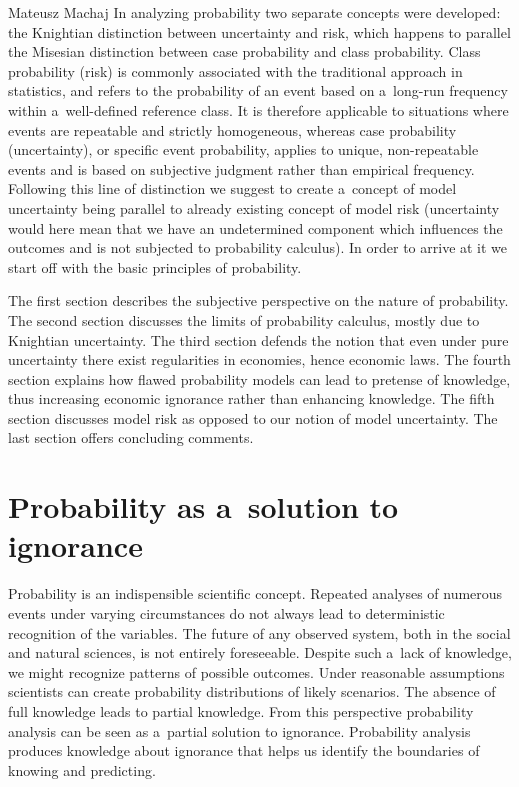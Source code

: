 \begin{artengenv}{Mateusz Machaj}
In analyzing probability two separate concepts were developed: the Knightian distinction between uncertainty and risk, which happens to parallel the Misesian distinction between case probability and class probability. Class probability (risk) is commonly associated with the traditional approach in statistics, and refers to the probability of an event based on a~long-run frequency within a~well-defined reference class. It is therefore applicable to situations where events are repeatable and strictly homogeneous, whereas case probability (uncertainty), or specific event probability, applies to unique, non-repeatable events and is based on subjective judgment rather than empirical frequency. Following this line of distinction we suggest to create a~concept of model uncertainty being parallel to already existing concept of model risk (uncertainty would here mean that we have an undetermined component which influences the outcomes and is not subjected to probability calculus). In order to arrive at it we start off with the basic principles of probability.



The first section describes the subjective perspective on the nature of probability. The second section discusses the limits of probability calculus, mostly due to Knightian uncertainty. The third section defends the notion that even under pure uncertainty there exist regularities in economies, hence economic laws. The fourth section explains how flawed probability models can lead to pretense of knowledge, thus increasing economic ignorance rather than enhancing knowledge. The fifth section discusses model risk as opposed to our notion of model uncertainty. The last section offers concluding comments.



\section{Probability as a~solution to ignorance}

Probability is an indispensible scientific concept. Repeated analyses of numerous events under varying circumstances do not always lead to deterministic recognition of the variables. The future of any observed system, both in the social and natural sciences, is not entirely foreseeable. Despite such a~lack of knowledge, we might recognize patterns of possible outcomes. Under reasonable assumptions scientists can create probability distributions of likely scenarios. The absence of full knowledge leads to partial knowledge. From this perspective probability analysis can be seen as a~partial solution to ignorance. Probability analysis produces knowledge about ignorance that helps us identify the boundaries of knowing and predicting.




\end{artengenv}
